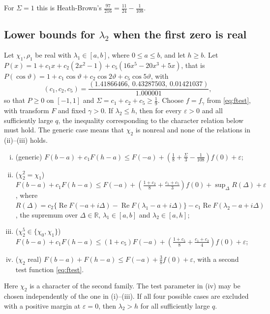 \documentclass[11pt]{amsart}
\numberwithin{equation}{section}
\theoremstyle{plain}
\theoremstyle{definition}
\theoremstyle{remark}
\newcommand{\RR}{\mathbb{R}}
\renewcommand{\Re}{\operatorname{Re}}
\newcommand{\eps}{\varepsilon}
\newcommand{\1}{\mathbf{1}}
\begin{document}
For $\Sigma=1$ this is Heath-Brown's $\frac{97}{216}=\frac{11}{24}-\frac1{108}$.

\subsection{Lower bounds for \texorpdfstring{$\lambda_2$}{lambda2} when the first zero is real}

\begin{proposition}\label{prop:realrows}
Let $\chi_1,\rho_1$ be real with $\lambda_1\in[a,b]$, where $0\le a\le b$, and let $h\ge b$. Let
$P(x)=1+c_1x+c_2(2x^2-1)+c_5(16x^5-20x^3+5x)$, that is
$P(\cos\vartheta)=1+c_1\cos\vartheta+c_2\cos2\vartheta+c_5\cos5\vartheta$, with
\[
  (c_1,c_2,c_5)=\frac{(1.41866466,\ 0.43287503,\ 0.01421037)}{1.000001},
\]
so that $P\ge0$ on $[-1,1]$ and $\Sigma=c_1+c_2+c_5\ge\frac19$.
Choose $f=f_\gamma$ from \eqref{eq:ftest}, with transform $F$ and fixed $\gamma>0$.
If $\lambda_2\le h$, then for every $\eps>0$ and all sufficiently large $q$, the inequality
corresponding to the character relation below must hold. The generic case means that
$\chi_2$ is nonreal and none of the relations in (ii)--(iii) holds.
\begin{enumerate}[(i)]
  \item (generic) $F(b-a)+c_1F(h-a)\le F(-a)+(\frac18+\frac\Sigma3-\frac1{108})f(0)+\eps$;
  \item ($\chi_2^2=\chi_1$) $F(b-a)+c_1F(h-a)\le F(-a)+(\frac{1+c_2}8+\frac{c_1+c_5}3)f(0)+\sup_\Delta R(\Delta)+\eps$,
    where $R(\Delta)=c_2\{\Re F(-a+i\Delta)-\Re F(\lambda_1-a+i\Delta)\}-c_1\Re F(\lambda_2-a+i\Delta)$, the supremum
    over $\Delta\in\RR$, $\lambda_1\in[a,b]$ and $\lambda_2\in[a,h]$;
  \item ($\chi_2^5\in\{\chi_0,\chi_1\}$) $F(b-a)+c_1F(h-a)\le(1+c_5)F(-a)+(\frac{1+c_5}8+\frac{c_1+c_2}4)f(0)+\eps$;
  \item ($\chi_2$ real) $F(b-a)+F(h-a)\le F(-a)+\frac38f(0)+\eps$, with a second test function
    \eqref{eq:ftest}.
\end{enumerate}
Here $\chi_2$ is a character of the second family. The test parameter in (iv) may be
chosen independently of the one in (i)--(iii). If all four possible cases are excluded
with a positive margin at $\eps=0$, then $\lambda_2>h$ for all sufficiently large $q$.
\end{proposition}
\end{document}
